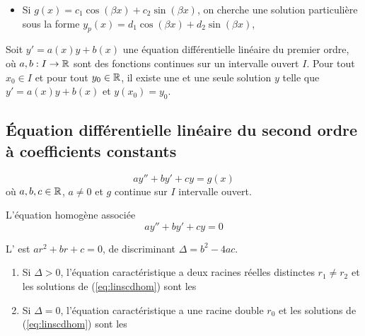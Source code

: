 \documentclass[10pt,class=article,crop=false]{standalone}
\begin{document}
\begin{multicols}{2}
\begin{itemize}
	\item Si $g(x) = c_1\cos(\beta x) + c_2 \sin(\beta x)$,  on cherche une solution particulière sous la forme $y_p(x) = d_1\cos(\beta x) + d_2 \sin(\beta x)$,	
\end{itemize}	


\begin{theoreme}
	\label{th:cauchylipschitzord1}	
	Soit $y'=a(x)y + b(x)$ une équation différentielle linéaire du premier ordre,
	où $a,b : I \to \mathbb{R}$ sont des fonctions continues sur un intervalle ouvert $I$.
	Pour tout $x_0 \in I$ et pour tout $y_0 \in \mathbb{R}$, il existe une et une
	seule solution $y$ telle que $y'=a(x)y + b(x)$ et $y(x_0)=y_0$.
\end{theoreme}


\subsection{Équation différentielle linéaire du second ordre à coefficients constants}

\begin{equation}
	ay''+by'+cy=g(x)
	\label{eq:linscd}
	\tag{$E$}
\end{equation}
où $a,b,c \in \mathbb{R}$, $a \neq 0$ et $g$ continue sur $I$
 intervalle ouvert.

L'équation homogène associée
\begin{equation}
	ay''+by'+cy=0
	\label{eq:linscdhom}
	\tag{$E_h$}
\end{equation}

L' est $ar^2+br+c=0$, de discriminant $\Delta= b^2-4ac$.

\begin{theoreme}
	\sauteligne
	\begin{enumerate}
		
		\item Si $\Delta >0$, l'équation caractéristique a deux racines réelles distinctes
		$r_1\neq r_2$ et les solutions de (\ref{eq:linscdhom}) sont les
		
		\item Si $\Delta=0$, l'équation caractéristique a une racine double $r_0$
		et les solutions de (\ref{eq:linscdhom}) sont les
		

\end{enumerate}
\end{theoreme}
\end{multicols}
\end{document}
